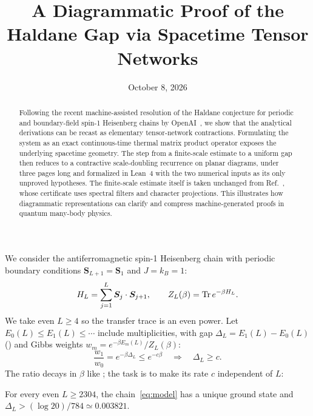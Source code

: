 \documentclass[aps,prl,reprint,amsmath,amssymb,nofootinbib,raggedbottom]{revtex4-2}
\begin{document}
\title{A Diagrammatic Proof of the Haldane Gap via Spacetime Tensor Networks}
\date{October 8, 2026}
\begin{abstract}
Following the recent machine-assisted resolution of the Haldane conjecture for periodic and boundary-field spin-1 Heisenberg chains by OpenAI~\cite{source,boundary}, we show that the analytical derivations can be recast as elementary tensor-network contractions.
Formulating the system as an exact continuous-time thermal matrix product operator exposes the underlying spacetime geometry.
The step from a finite-scale estimate to a uniform gap then reduces to a contractive scale-doubling recurrence on planar diagrams, under three pages long and formalized in Lean~4 with the two numerical inputs as its only unproved hypotheses.
The finite-scale estimate itself is taken unchanged from Ref.~\cite{source}, whose certificate uses spectral filters and character projections.
This illustrates how diagrammatic representations can clarify and compress machine-generated proofs in quantum many-body physics.
\end{abstract}
\maketitle
\setlength{\abovedisplayskip}{5pt plus 2pt minus 1pt}
\setlength{\belowdisplayskip}{5pt plus 2pt minus 1pt}

We consider the antiferromagnetic spin-1 Heisenberg chain with periodic
boundary conditions $\bm S_{L+1}=\bm S_1$ and $J=k_B=1$:
\begin{equation}
 H_L=\sum_{j=1}^L\bm S_j\cdot\bm S_{j+1},\qquad
 Z_L(\beta)=\operatorname{Tr} e^{-\beta H_L}.
 \label{eq:model}
\end{equation}
We take even $L\ge4$ so the transfer trace is an even power. Let $E_0(L)\le E_1(L)\le\cdots$ include multiplicities, with gap
$\Delta_L=E_1(L)-E_0(L)$ (\levels) and Gibbs weights
$w_m=e^{-\beta E_m(L)}/Z_L(\beta)$:
\begin{equation}
 \frac{w_1}{w_0}=e^{-\beta\Delta_L}\le e^{-c\beta}
 \quad\Longrightarrow\quad \Delta_L\ge c.
 \label{eq:target}
\end{equation}
The ratio decays in $\beta$ like \decayglyph; the task is to make its
rate $c$ independent of $L$:
\begin{theorem}\label{thm:gap}
For every even $L\ge2304$, the chain~\eqref{eq:model} has a unique ground
state and $\Delta_L>(\log20)/784\simeq0.003821$.
\end{theorem}
\end{document}
